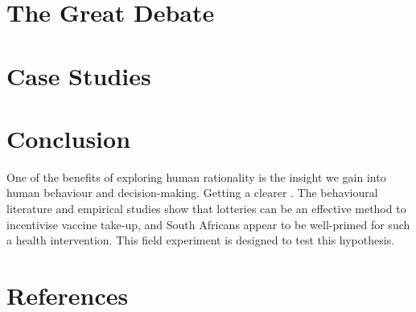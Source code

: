 \documentclass[11pt,preprint, authoryear]{elsarticle}
\numberwithin{equation}{section}
\numberwithin{figure}{section}
\numberwithin{table}{section}
\begin{document}
\hypertarget{the-great-debate}{%
\section{\texorpdfstring{The Great Debate
\label{rev}}{The Great Debate }}\label{the-great-debate}}

\hypertarget{case-studies}{%
\section{\texorpdfstring{Case Studies
\label{case}}{Case Studies }}\label{case-studies}}

\hypertarget{conclusion}{%
\section{\texorpdfstring{Conclusion
\label{con}}{Conclusion }}\label{conclusion}}

One of the benefits of exploring human rationality is the insight we
gain into human behaviour and decision-making. Getting a clearer . The
behavioural literature and empirical studies show that lotteries can be
an effective method to incentivise vaccine take-up, and South Africans
appear to be well-primed for such a health intervention. This field
experiment is designed to test this hypothesis.

\newpage

\hypertarget{references}{%
\section*{References}\label{references}}
\end{document}
